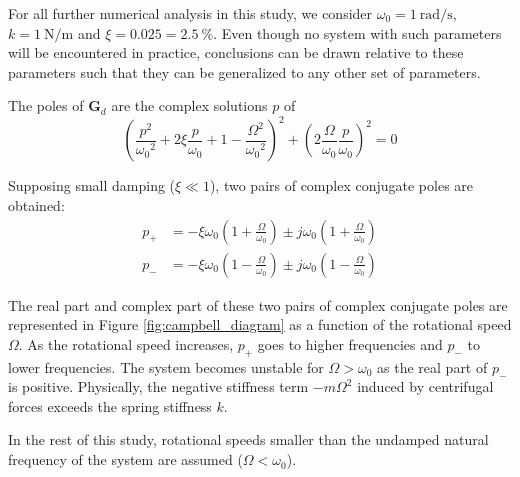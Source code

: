 \documentclass[Afour,sagev,times]{sagej}
\begin{document}
For all further numerical analysis in this study, we consider \(\omega_0 = \SI{1}{\radian\per\second}\), \(k = \SI{1}{\newton\per\meter}\) and \(\xi = 0.025 = \SI{2.5}{\percent}\).
Even though no system with such parameters will be encountered in practice, conclusions can be drawn relative to these parameters such that they can be generalized to any other set of parameters.

\par
The poles of \(\bm{G}_d\) are the complex solutions \(p\) of
\begin{equation}
  \left( \frac{p^2}{{\omega_0}^2} + 2 \xi \frac{p}{\omega_0} + 1 - \frac{{\Omega}^2}{{\omega_0}^2} \right)^2 + \left( 2 \frac{\Omega}{\omega_0} \frac{p}{\omega_0} \right)^2 = 0
\end{equation}

Supposing small damping (\(\xi \ll 1\)), two pairs of complex conjugate poles are obtained:
\begin{subequations}
\label{eq:pole_values}
  \begin{align}
    p_{+} &= - \xi \omega_0 \left( 1 + \frac{\Omega}{\omega_0} \right) \pm j \omega_0 \left( 1 + \frac{\Omega}{\omega_0} \right) \\
    p_{-} &= - \xi \omega_0 \left( 1 - \frac{\Omega}{\omega_0} \right) \pm j \omega_0 \left( 1 - \frac{\Omega}{\omega_0} \right)
  \end{align}
\end{subequations}

The real part and complex part of these two pairs of complex conjugate poles are represented in Figure \ref{fig:campbell_diagram} as a function of the rotational speed \(\Omega\).
As the rotational speed increases, \(p_{+}\) goes to higher frequencies and \(p_{-}\) to lower frequencies.
The system becomes unstable for \(\Omega > \omega_0\) as the real part of \(p_{-}\) is positive.
Physically, the negative stiffness term \(-m\Omega^2\) induced by centrifugal forces exceeds the spring stiffness \(k\).

In the rest of this study, rotational speeds smaller than the undamped natural frequency of the system are assumed (\(\Omega < \omega_0\)).
\end{document}
